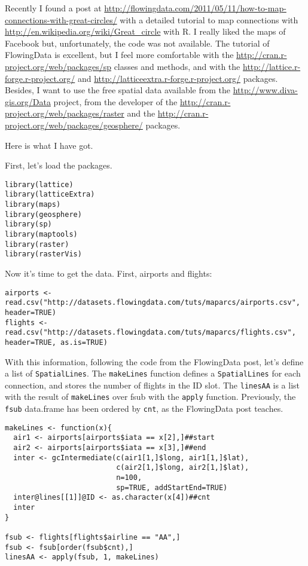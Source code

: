 


Recently I found a post at \url{http://flowingdata.com/2011/05/11/how-to-map-connections-with-great-circles/} with a detailed tutorial to
map connections with \url{http://en.wikipedia.org/wiki/Great_circle} with R. I really liked the maps
of Facebook but, unfortunately, the code was not available.  The
tutorial of FlowingData is excellent, but I feel more comfortable
with the \url{http://cran.r-project.org/web/packages/sp} classes and methods, and with the \url{http://lattice.r-forge.r-project.org/} and
\url{http://latticeextra.r-forge.r-project.org/} packages.  Besides, I want to use the free spatial
data available from the \url{http://www.diva-gis.org/Data} project, from the developer of
the \url{http://cran.r-project.org/web/packages/raster} and the \url{http://cran.r-project.org/web/packages/geosphere/} packages.

Here is what I have got.

First, let's load the packages.


\lstset{language=R}
\begin{lstlisting}
library(lattice)
library(latticeExtra)
library(maps)
library(geosphere)
library(sp)
library(maptools)
library(raster)
library(rasterVis)
\end{lstlisting}

Now it's time to get the data. First, airports and flights:


\lstset{language=R}
\begin{lstlisting}
airports <- read.csv("http://datasets.flowingdata.com/tuts/maparcs/airports.csv", header=TRUE)
flights <- read.csv("http://datasets.flowingdata.com/tuts/maparcs/flights.csv", header=TRUE, as.is=TRUE)
\end{lstlisting}

With this information, following the code from the FlowingData
post, let's define a list of \texttt{SpatialLines}.  The \texttt{makeLines}
function defines a \texttt{SpatialLines} for each connection, and stores
the number of flights in the ID slot.  The \texttt{linesAA} is a list
with the result of \texttt{makeLines} over fsub with the \texttt{apply}
function.  Previously, the \texttt{fsub} data.frame has been ordered by
\texttt{cnt}, as the FlowingData post teaches.


\lstset{language=r}
\begin{lstlisting}
makeLines <- function(x){
  air1 <- airports[airports$iata == x[2],]##start
  air2 <- airports[airports$iata == x[3],]##end
  inter <- gcIntermediate(c(air1[1,]$long, air1[1,]$lat),
                          c(air2[1,]$long, air2[1,]$lat),
                          n=100,
                          sp=TRUE, addStartEnd=TRUE)
  inter@lines[[1]]@ID <- as.character(x[4])##cnt
  inter 
}

fsub <- flights[flights$airline == "AA",]
fsub <- fsub[order(fsub$cnt),]
linesAA <- apply(fsub, 1, makeLines)
\end{lstlisting}

